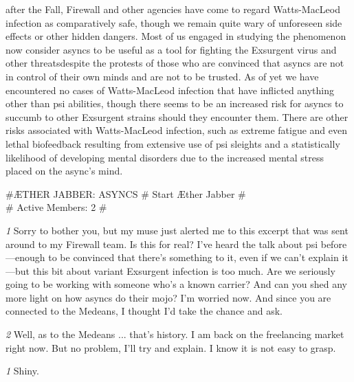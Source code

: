 after the Fall, Firewall and other agencies have come to regard Watts-MacLeod infection as comparatively safe, though we remain quite wary of unforeseen side effects or other hidden dangers. Most of us engaged in studying the phenomenon now consider asyncs to be useful as a tool for fighting the Exsurgent virus and other threatsdespite the protests of those who are convinced that asyncs are not in control of their own minds and are not to be trusted. As of yet we have encountered no cases of Watts-MacLeod infection that have inflicted anything other than psi abilities, though there seems to be an increased risk for asyncs to succumb to other Exsurgent strains should they encounter them. There are other risks associated with Watts-MacLeod infection, such as extreme fatigue and even lethal biofeedback resulting from extensive use of psi sleights and a statistically likelihood of developing mental disorders due to the increased mental stress placed on the async’s mind. 

\newpage

\#{ÆTHER JABBER: ASYNCS} \# Start Æther Jabber \# \\ \# Active Members: 2 \# 

\textit{\textit{1}} Sorry to bother you, but my muse just alerted me to this excerpt that was sent around to my Firewall team. Is this for real? I’ve heard the talk about psi before—enough to be convinced that there’s something to it, even if we can’t explain it—but this bit about variant Exsurgent infection is too much. Are we seriously going to be working with someone who’s a known carrier? And can you shed any more light on how asyncs do their mojo? I’m worried now. And since you are connected to the Medeans, I thought I’d take the chance and ask. 

\textit{\textit{2}} Well, as to the Medeans ... that’s history. I am back on the freelancing market right now. But no problem, I’ll try and explain. I know it is not easy to grasp. 

\textit{\textit{1}} Shiny. 

